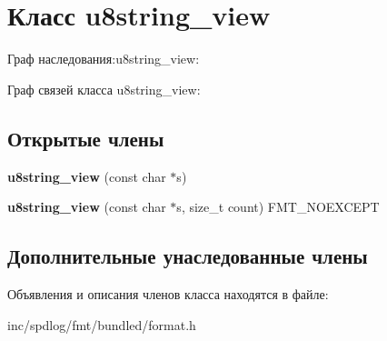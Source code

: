 \hypertarget{classu8string__view}{}\section{Класс u8string\+\_\+view}
\label{classu8string__view}


Граф наследования\+:u8string\+\_\+view\+:


Граф связей класса u8string\+\_\+view\+:
\subsection*{Открытые члены}
\begin{DoxyCompactItemize}
\item 
\mbox{\label{classu8string__view_a57d3b2e6c9febc4289c936faf413633f}} 
{\bfseries u8string\+\_\+view} (const char $\ast$s)
\item 
\mbox{\label{classu8string__view_a29121b197fae2d1b2e373cdf66f99c48}} 
{\bfseries u8string\+\_\+view} (const char $\ast$s, size\+\_\+t count) F\+M\+T\+\_\+\+N\+O\+E\+X\+C\+E\+PT
\end{DoxyCompactItemize}
\subsection*{Дополнительные унаследованные члены}


Объявления и описания членов класса находятся в файле\+:\begin{DoxyCompactItemize}
\item 
inc/spdlog/fmt/bundled/format.\+h\end{DoxyCompactItemize}
